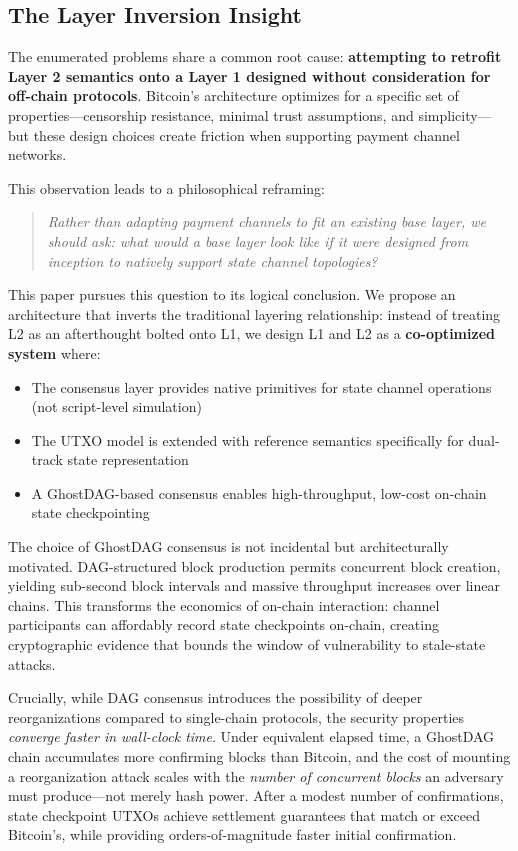 \documentclass[11pt,a4paper]{article}
\begin{document}
\subsection{The Layer Inversion Insight}

The enumerated problems share a common root cause: \textbf{attempting to retrofit Layer 2 semantics onto a Layer 1 designed without consideration for off-chain protocols}. Bitcoin's architecture optimizes for a specific set of properties---censorship resistance, minimal trust assumptions, and simplicity---but these design choices create friction when supporting payment channel networks.

This observation leads to a philosophical reframing:

\begin{quote}
\textit{Rather than adapting payment channels to fit an existing base layer, we should ask: what would a base layer look like if it were designed from inception to natively support state channel topologies?}
\end{quote}

This paper pursues this question to its logical conclusion. We propose an architecture that inverts the traditional layering relationship: instead of treating L2 as an afterthought bolted onto L1, we design L1 and L2 as a \textbf{co-optimized system} where:
\begin{itemize}
    \item The consensus layer provides native primitives for state channel operations (not script-level simulation)
    \item The UTXO model is extended with reference semantics specifically for dual-track state representation
    \item A GhostDAG-based consensus enables high-throughput, low-cost on-chain state checkpointing
\end{itemize}

The choice of GhostDAG consensus is not incidental but architecturally motivated. DAG-structured block production permits concurrent block creation, yielding sub-second block intervals and massive throughput increases over linear chains. This transforms the economics of on-chain interaction: channel participants can affordably record state checkpoints on-chain, creating cryptographic evidence that bounds the window of vulnerability to stale-state attacks.

Crucially, while DAG consensus introduces the possibility of deeper reorganizations compared to single-chain protocols, the security properties \textit{converge faster in wall-clock time}. Under equivalent elapsed time, a GhostDAG chain accumulates more confirming blocks than Bitcoin, and the cost of mounting a reorganization attack scales with the \textit{number of concurrent blocks} an adversary must produce---not merely hash power. After a modest number of confirmations, state checkpoint UTXOs achieve settlement guarantees that match or exceed Bitcoin's, while providing orders-of-magnitude faster initial confirmation.
\end{document}
